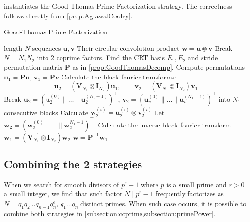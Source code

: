  instantiates the Good-Thomas Prime Factorization strategy. The correctness follows directly from \cref{prop:AgrawalCooley}.
\begin{algorithm}[h]
    \caption{Good-Thomas Prime Factorization}\label{alg:GoodThomas}
    \begin{algorithmic}[1]
         length \(N\) sequences \(\bm{u}, \bm{v}\)
        \Ensure Their circular convolution product \(\bm{w} = \bm{u} \circledast \bm{v}\)
        \State Break \(N = N_1 N_2\) into 2 coprime factors. Find the CRT basis \(E_1, E_2\) and stride permutation matrix \(\bm{P}\) as in \cref{prop:GoodThomasDecomp}.
        \State Compute permutations \(\bm{u}_1 = \bm{P} \bm{u}\), \(\bm{v}_1 = \bm{P} \bm{v}\)
        \State Calculate the block fourier transforms:
        \[ \bm{u}_2 = \left(\bm{V}_{N_1} \otimes \bm{I}_{N_2}\right) \bm{u}_1, \qquad \bm{v}_2 = \left(\bm{V}_{N_1} \otimes \bm{I}_{N_2}\right) \bm{v}_1\] 
        \State Break \(\bm{u}_2 = (\bm{u}_2^{(0)} \parallel \ldots \parallel \bm{u}_2^{(N_1 - 1)})^{\top}\), \(\bm{v}_2 = (\bm{u}_v^{(0)} \parallel \ldots \parallel \bm{u}_v^{(N_1 - 1)})^{\top}\) into \(N_1\) consecutive blocks
            \State Calculate \(\bm{w}_2^{(i)} = \bm{u}_2^{(i)} \circledast \bm{v}_2^{(i)}\) 
        \EndFor
        \State Let \(\bm{w}_2 = (\bm{w}_2^{(0)} \parallel \ldots \parallel \bm{w}_2^{N_1 - 1})^{\top}\). Calculate the inverse block fourier transform \(\bm{w}_1 = \left(\bm{V}_{N_1}^{-1} \otimes \bm{I}_{N_2}\right) \bm{w}_2\)
         \(\bm{w} = \bm{P}^{-1} \bm{w}_1\)
    \end{algorithmic}
\end{algorithm}

\subsection{Combining the 2 strategies} \label{subsection:combination}
When we search for smooth divisors of \(p^r - 1\) where \(p\) is a small prime and \(r>0\) a small integer, we find that such factor \(N \mid p^r - 1\) frequently factorizes as \(N = q_1 q_2 \ldots q_{n-1} q_n^e\), \(q_1 \ldots q_n\) distinct primes. When such case occurs, it is possible to combine both strategies in \cref{subsection:coprime,subsection:primePower}. 

